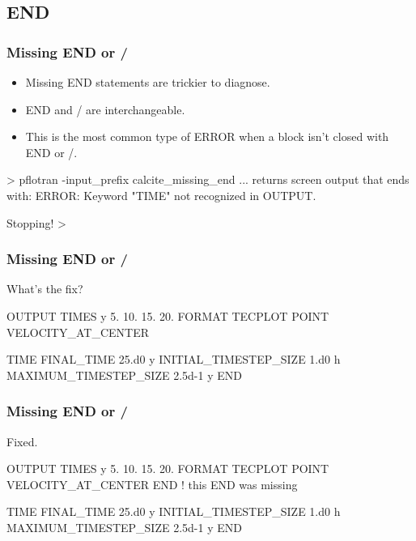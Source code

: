 \documentclass{beamer}
\newcommand\gehcomment[1]{{{\color{orange} #1}}}
\newcommand\redcomment[1]{{{\color{red} #1}}}
\newcommand\bluecomment[1]{{{\color{blue} #1}}}
\newcommand\greencomment[1]{{{\color{green} #1}}}
\newcommand\magentacomment[1]{{{\color{magenta} #1}}}
\begin{document}
\subsection{END}

\begin{frame}\frametitle{Missing \greencomment{END} or \greencomment{/}}
\begin{itemize}
\item Missing \greencomment{END} statements are trickier to diagnose.
\item \greencomment{END} and \greencomment{/} are interchangeable.
\item This is the most common type of ERROR when a block isn't closed with \greencomment{END} or \greencomment{/}.
\end{itemize}
\begin{semiverbatim}

> pflotran -input_prefix calcite_missing_end
... \gehcomment{returns screen output that ends with:}
  ERROR:  Keyword "TIME" not recognized in OUTPUT.

  Stopping!
>
\end{semiverbatim}

\end{frame}

\begin{frame}\frametitle{Missing \greencomment{END} or \greencomment{/}}
\redcomment{What's the fix?}
\begin{semiverbatim}

OUTPUT
  TIMES y 5. 10. 15. 20.
  FORMAT TECPLOT POINT
  VELOCITY_AT_CENTER

TIME
  FINAL_TIME 25.d0 y
  INITIAL_TIMESTEP_SIZE 1.d0 h
  MAXIMUM_TIMESTEP_SIZE 2.5d-1 y
END
\end{semiverbatim}

\end{frame}

\begin{frame}\frametitle{Missing \greencomment{END} or \greencomment{/}}
\redcomment{Fixed.}
\begin{semiverbatim}

OUTPUT
  TIMES y 5. 10. 15. 20.
  FORMAT TECPLOT POINT
  VELOCITY_AT_CENTER
\magentacomment{END} \bluecomment{! this \greencomment{END} was missing}

TIME
  FINAL_TIME 25.d0 y
  INITIAL_TIMESTEP_SIZE 1.d0 h
  MAXIMUM_TIMESTEP_SIZE 2.5d-1 y
END
\end{semiverbatim}

\end{frame}
\end{document}
